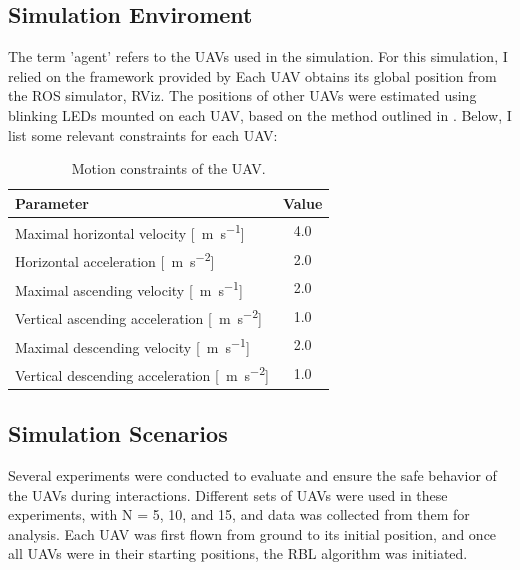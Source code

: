     \subsection{Simulation Enviroment}
        The term 'agent' refers to the UAVs used in the simulation.
        For this simulation, I relied on the framework provided by \cite{mrs_uav_system}
        Each UAV obtains its global position from the ROS simulator, RViz.
        The positions of other UAVs were estimated using blinking LEDs mounted on each UAV, based on the method outlined in \cite{uvdd1}.
        Below, I list some relevant constraints for each UAV:
        \begin{table}[h]
            \centering
            \renewcommand{\arraystretch}{1.1}
            \begin{tabular}{|l|c|}
                \hline
                \textbf{Parameter} & \textbf{Value} \\ \hline
                    Maximal horizontal velocity [\SI{}{\meter\per\second}] & 4.0 \\ \hline
                    Horizontal acceleration [\SI{}{\meter\per\second\squared}] & 2.0 \\ \hline
                    Maximal ascending velocity [\SI{}{\meter\per\second}] & 2.0 \\ \hline
                    Vertical ascending acceleration [\SI{}{\meter\per\second\squared}] & 1.0 \\ \hline
                    Maximal descending velocity [\SI{}{\meter\per\second}] & 2.0 \\ \hline
                    Vertical descending acceleration [\SI{}{\meter\per\second\squared}] & 1.0 \\ \hline
                \end{tabular}
                \caption{Motion constraints of the UAV.}
            \label{tab:uav_constraints}
        \end{table}
    \subsection{Simulation Scenarios}
        Several experiments were conducted to evaluate and ensure the safe behavior of the UAVs during interactions. 
        Different sets of UAVs were used in these experiments, with N = 5, 10, and 15, and data was collected from them for analysis. 
        Each UAV was first flown from ground to its initial position, and once all UAVs were in their starting positions, the RBL algorithm was initiated.

